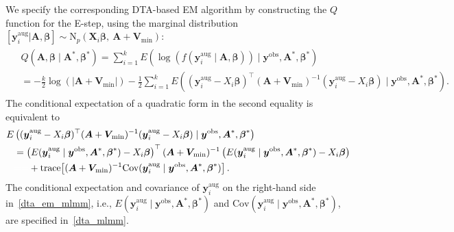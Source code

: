 \documentclass[12pt]{article}
\begin{document}
\begin{appendix}
We specify the corresponding DTA-based EM algorithm  by constructing the $Q$ function for the E-step, using the marginal distribution $[\boldsymbol{y}_i^{\textrm{aug}}\vert \boldsymbol{A}, \boldsymbol{\beta}]  \sim \textrm{N}_p(\boldsymbol{X}\!_i\boldsymbol{\beta},~ \boldsymbol{A}+\boldsymbol{V}\!_{\textrm{min}})$:
\begin{align}
\begin{aligned}\label{dta_m}
&Q(\boldsymbol{A}, \boldsymbol{\beta}\mid \boldsymbol{A}^\ast, \boldsymbol{\beta}^\ast)=\sum_{i=1}^kE\left(\log(f(\boldsymbol{y}^{\textrm{aug}}_i\mid \boldsymbol{A}, \boldsymbol{\beta}))\mid \boldsymbol{y}^{\textrm{obs}}, \boldsymbol{A}^\ast, \boldsymbol{\beta}^\ast\right)\\
&=-\frac{k}{2}\log(\vert \boldsymbol{A}+\boldsymbol{V}\!_{\min}\vert)-\frac{1}{2}\sum_{i=1}^kE\left( (\boldsymbol{y}^{\textrm{aug}}_i-X_i\boldsymbol{\beta})^\top(\boldsymbol{A}+\boldsymbol{V}\!_{\textrm{min}})^{-1}(\boldsymbol{y}^{\textrm{aug}}_i-X_i\boldsymbol{\beta})\mid \boldsymbol{y}^{\textrm{obs}}, \boldsymbol{A}^\ast, \boldsymbol{\beta}^\ast\right).
\end{aligned}
\end{align}
The conditional expectation of a quadratic form in the second equality is equivalent to
\begin{align}
\begin{aligned}\label{dta_em_mlmm}
E&\left( (\boldsymbol{y}^{\textrm{aug}}_i-X_i\boldsymbol{\beta})^\top(\boldsymbol{A}+\boldsymbol{V}\!_{\textrm{min}})^{-1}(\boldsymbol{y}^{\textrm{aug}}_i-X_i\boldsymbol{\beta})\mid \boldsymbol{y}^{\textrm{obs}}, \boldsymbol{A}^\ast, \boldsymbol{\beta}^\ast\right)\\
&=\left( E(\boldsymbol{y}^{\textrm{aug}}_i \mid \boldsymbol{y}^{\textrm{obs}}, \boldsymbol{A}^\ast, \boldsymbol{\beta}^\ast)-X_i\boldsymbol{\beta}\right)^\top(\boldsymbol{A}+\boldsymbol{V}\!_{\textrm{min}})^{-1}\left( E(\boldsymbol{y}^{\textrm{aug}}_i\mid \boldsymbol{y}^{\textrm{obs}}, \boldsymbol{A}^\ast, \boldsymbol{\beta}^\ast)-X_i\boldsymbol{\beta}\right)\\
&\textcolor{white}{==}+\textrm{trace}\!\left[ (\boldsymbol{A}+\boldsymbol{V}\!_{\textrm{min}})^{-1}\textrm{Cov}(\boldsymbol{y}^{\textrm{aug}}_i\mid \boldsymbol{y}^{\textrm{obs}}, \boldsymbol{A}^\ast, \boldsymbol{\beta}^\ast)\right].
\end{aligned}
\end{align}
The conditional expectation and covariance of $\boldsymbol{y}^{\textrm{aug}}_i$ on the right-hand side in~\eqref{dta_em_mlmm}, i.e., $E(\boldsymbol{y}^{\textrm{aug}}_i \mid \boldsymbol{y}^{\textrm{obs}}, \boldsymbol{A}^\ast, \boldsymbol{\beta}^\ast)$ and $\textrm{Cov}(\boldsymbol{y}^{\textrm{aug}}_i\mid \boldsymbol{y}^{\textrm{obs}}, \boldsymbol{A}^\ast, \boldsymbol{\beta}^\ast)$, are specified in~\eqref{dta_mlmm}.


\end{appendix}
\end{document}
